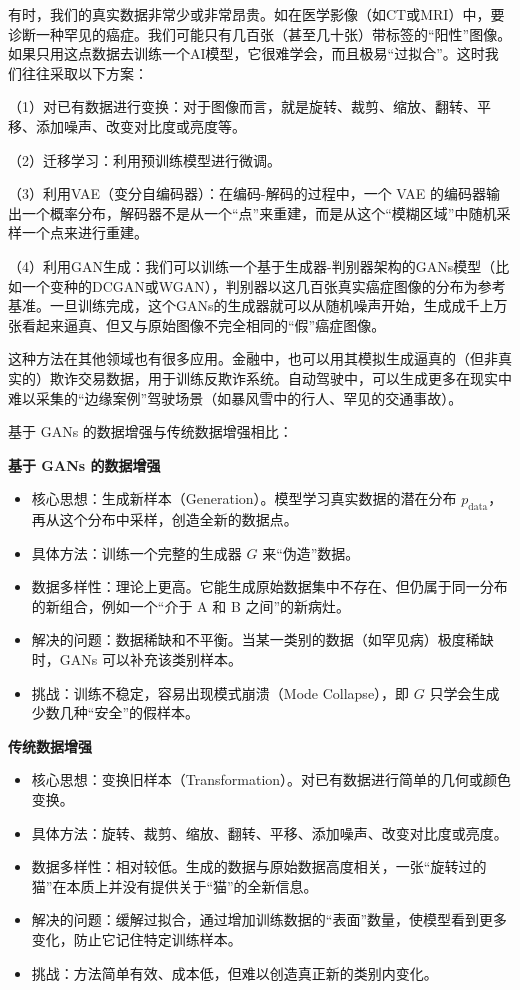 有时，我们的真实数据非常少或非常昂贵。如在医学影像（如CT或MRI）中，要诊断一种罕见的癌症。我们可能只有几百张（甚至几十张）带标签的``阳性''图像。如果只用这点数据去训练一个AI模型，它很难学会，而且极易``过拟合''。这时我们往往采取以下方案：

（1）对已有数据进行变换：对于图像而言，就是旋转、裁剪、缩放、翻转、平移、添加噪声、改变对比度或亮度等。

（2）迁移学习：利用预训练模型进行微调。

（3）利用VAE（变分自编码器）：在编码-解码的过程中，一个 VAE 的编码器输出一个概率分布，解码器不是从一个``点''来重建，而是从这个``模糊区域''中随机采样一个点来进行重建。

（4）利用GAN生成：我们可以训练一个基于生成器-判别器架构的GANs模型（比如一个变种的DCGAN或WGAN），判别器以这几百张真实癌症图像的分布为参考基准。一旦训练完成，这个GANs的生成器就可以从随机噪声开始，生成成千上万张看起来逼真、但又与原始图像不完全相同的``假''癌症图像。

这种方法在其他领域也有很多应用。金融中，也可以用其模拟生成逼真的（但非真实的）欺诈交易数据，用于训练反欺诈系统。自动驾驶中，可以生成更多在现实中难以采集的``边缘案例''驾驶场景（如暴风雪中的行人、罕见的交通事故）。

基于 GANs 的数据增强与传统数据增强相比：

\textbf{基于 GANs 的数据增强}

\begin{itemize}
\tightlist
\item
  核心思想：生成新样本（Generation）。模型学习真实数据的潜在分布 \(p_{\mathrm{data}}\)，再从这个分布中采样，创造全新的数据点。
\item
  具体方法：训练一个完整的生成器 \(G\) 来``伪造''数据。
\item
  数据多样性：理论上更高。它能生成原始数据集中不存在、但仍属于同一分布的新组合，例如一个``介于 A 和 B 之间''的新病灶。
\item
  解决的问题：数据稀缺和不平衡。当某一类别的数据（如罕见病）极度稀缺时，GANs 可以补充该类别样本。
\item
  挑战：训练不稳定，容易出现模式崩溃（Mode Collapse），即 \(G\) 只学会生成少数几种``安全''的假样本。
\end{itemize}

\textbf{传统数据增强}

\begin{itemize}
\tightlist
\item
  核心思想：变换旧样本（Transformation）。对已有数据进行简单的几何或颜色变换。
\item
  具体方法：旋转、裁剪、缩放、翻转、平移、添加噪声、改变对比度或亮度。
\item
  数据多样性：相对较低。生成的数据与原始数据高度相关，一张``旋转过的猫''在本质上并没有提供关于``猫''的全新信息。
\item
  解决的问题：缓解过拟合，通过增加训练数据的``表面''数量，使模型看到更多变化，防止它记住特定训练样本。
\item
  挑战：方法简单有效、成本低，但难以创造真正新的类别内变化。
\end{itemize}

